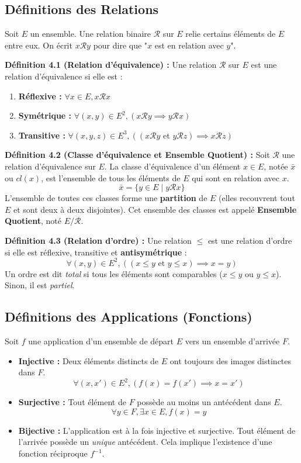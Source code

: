 \documentclass[12pt,a4paper]{report}
\begin{document}
\subsection{Définitions des Relations}
Soit $E$ un ensemble. Une relation binaire $\mathcal{R}$ sur $E$ relie certains éléments de $E$ entre eux. On écrit $x \mathcal{R} y$ pour dire que "$x$ est en relation avec $y$".

\textbf{Définition 4.1 (Relation d'équivalence) :}
Une relation $\mathcal{R}$ sur $E$ est une relation d'équivalence si elle est :
\begin{enumerate}
    \item \textbf{Réflexive :} $\forall x \in E, x \mathcal{R} x$
    \item \textbf{Symétrique :} $\forall (x,y) \in E^2, (x \mathcal{R} y \implies y \mathcal{R} x)$
    \item \textbf{Transitive :} $\forall (x,y,z) \in E^3, ((x \mathcal{R} y \text{ et } y \mathcal{R} z) \implies x \mathcal{R} z)$
\end{enumerate}

\textbf{Définition 4.2 (Classe d'équivalence et Ensemble Quotient) :}
Soit $\mathcal{R}$ une relation d'équivalence sur $E$. La classe d'équivalence d'un élément $x \in E$, notée $\bar{x}$ ou $cl(x)$, est l'ensemble de tous les éléments de $E$ qui sont en relation avec $x$.
$$ \bar{x} = \{ y \in E \mid y \mathcal{R} x \} $$
L'ensemble de toutes ces classes forme une \textbf{partition} de $E$ (elles recouvrent tout $E$ et sont deux à deux disjointes). Cet ensemble des classes est appelé \textbf{Ensemble Quotient}, noté $E/\mathcal{R}$.

\textbf{Définition 4.3 (Relation d'ordre) :}
Une relation $\le$ est une relation d'ordre si elle est réflexive, transitive et \textbf{antisymétrique} :
$$ \forall (x,y) \in E^2, ((x \le y \text{ et } y \le x) \implies x = y) $$
Un ordre est dit \textit{total} si tous les éléments sont comparables ($x \le y$ ou $y \le x$). Sinon, il est \textit{partiel}.

\subsection{Définitions des Applications (Fonctions)}


Soit $f$ une application d'un ensemble de départ $E$ vers un ensemble d'arrivée $F$.
\begin{itemize}
    \item \textbf{Injective :} Deux éléments distincts de $E$ ont toujours des images distinctes dans $F$.
    $$ \forall (x, x') \in E^2, (f(x) = f(x') \implies x = x') $$
    \item \textbf{Surjective :} Tout élément de $F$ possède au moins un antécédent dans $E$.
    $$ \forall y \in F, \exists x \in E, f(x) = y $$
    \item \textbf{Bijective :} L'application est à la fois injective et surjective. Tout élément de l'arrivée possède un \textit{unique} antécédent. Cela implique l'existence d'une fonction réciproque $f^{-1}$.
\end{itemize}
\end{document}
